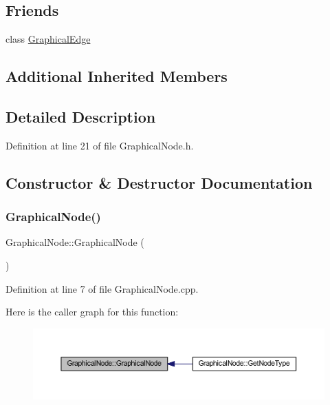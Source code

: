 \subsection*{Friends}
\begin{DoxyCompactItemize}
\item 
class \hyperlink{class_graphical_node_a2a860a1faf189243ba02f50ad8362bfa}{Graphical\+Edge}
\end{DoxyCompactItemize}
\subsection*{Additional Inherited Members}


\subsection{Detailed Description}


Definition at line 21 of file Graphical\+Node.\+h.



\subsection{Constructor \& Destructor Documentation}
\mbox{\label{class_graphical_node_a9c34baa875b133f8c5b1da78da189f1d}} 
\subsubsection{\texorpdfstring{Graphical\+Node()}{GraphicalNode()}\hspace{0.1cm}{\footnotesize\ttfamily [1/5]}}
{\footnotesize\ttfamily Graphical\+Node\+::\+Graphical\+Node (\begin{DoxyParamCaption}{ }\end{DoxyParamCaption})}



Definition at line 7 of file Graphical\+Node.\+cpp.

Here is the caller graph for this function\+:
\nopagebreak
\begin{figure}[H]
\begin{center}
\leavevmode
\includegraphics[width=350pt]{class_graphical_node_a9c34baa875b133f8c5b1da78da189f1d_icgraph}
\end{center}
\end{figure}
\mbox{\label{class_graphical_node_a831cbab85b4aa47c9e5e45f13f840671}} 
